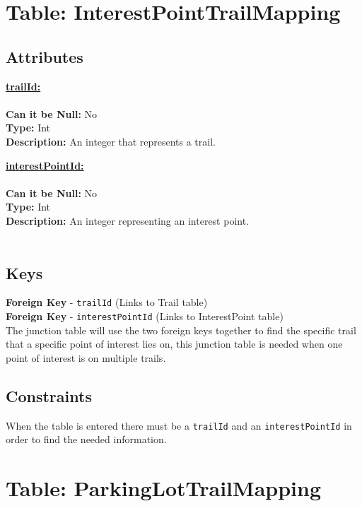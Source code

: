\newpage
\section{Table: InterestPointTrailMapping}
\subsection{Attributes}
\textbf{\underline{trailId:}}\\
\\
\textbf{Can it be Null:} No\\
\textbf{Type:} Int\\
\textbf{Description:} An integer that represents a trail.

\textbf{\underline{interestPointId:}}\\
\\
\textbf{Can it be Null:} No\\
\textbf{Type:} Int\\
\textbf{Description:}  An integer representing an interest point.\\\\

\subsection{Keys}
\textbf{Foreign Key} - \texttt{trailId} (Links to Trail table)\\
\textbf{Foreign Key} - \texttt{interestPointId} (Links to InterestPoint table)\\
The junction table will use the two foreign keys together to find the specific
trail that a specific point of interest lies on, this junction table is needed when one point of interest is on multiple trails.

\subsection{Constraints}
When the table is entered there must be a \texttt{trailId} and an \texttt{interestPointId} in order to find the needed information.








\newpage
\section{Table: ParkingLotTrailMapping}
